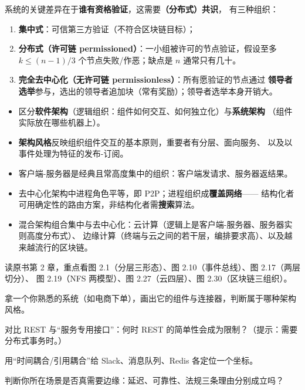\medskip\noindent 系统的关键差异在于\textbf{谁有资格验证}，这需要\textbf{（分布式）共识}，
有三种组织：
\begin{enumerate}[leftmargin=1.6em]
  \item \textbf{集中式}：可信第三方验证（不符合区块链目标）；
  \item \textbf{分布式（许可链 permissioned）}：一小组被许可的节点验证，假设至多
        $k \le (n-1)/3$ 个节点失败/作恶；缺点是 $n$ 通常只有几十。
  \item \textbf{完全去中心化（无许可链 permissionless）}：所有愿验证的节点通过
        \textbf{领导者选举}参与，选出的领导者追加块（常有奖励）；领导者选举本身开销大。
\end{enumerate}

\begin{closeread}
\end{closeread}



\begin{itemize}
  \item 区分\textbf{软件架构}（逻辑组织：组件如何交互、如何独立化）与\textbf{系统架构}
        （组件实际放在哪些机器上）。
  \item \textbf{架构风格}反映组织组件交互的基本原则，重要者有分层、面向服务、
        以及以事件处理为特征的发布-订阅。
  \item 客户端-服务器是经典且常高度集中的组织：客户端发请求、服务器返结果。
  \item 去中心化架构中进程角色平等，即 P2P；进程组织成\textbf{覆盖网络}——
        结构化者可用确定性的路由方案，非结构化者需\textbf{搜索}算法。
  \item 混合架构组合集中与去中心化：云计算（逻辑上是客户端-服务器、服务器实则高度分布式）、
        边缘计算（终端与云之间的若干层，编排要求高）、以及越来越流行的区块链。
\end{itemize}

\begin{actions}
  \item 读原书第 2 章，重点看图 2.1（分层三形态）、图 2.10（事件总线）、图 2.17（两层切分）、
        图 2.19（NFS 两模型）、图 2.27（云四层）、图 2.30（区块链三组织）。
  \item 拿一个你熟悉的系统（如电商下单），画出它的组件与连接器，判断属于哪种架构风格。
  \item 对比 REST 与“服务专用接口”：何时 REST 的简单性会成为限制？（提示：需要分布式事务时。）
  \item 用“时间耦合/引用耦合”给 Slack、消息队列、Redis 各定位一个坐标。
  \item 判断你所在场景是否真需要边缘：延迟、可靠性、法规三条理由分别成立吗？
\end{actions}
